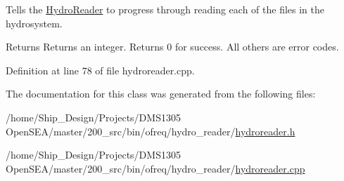 Tells the \hyperlink{classosea_1_1_hydro_reader}{Hydro\-Reader} to progress through reading each of the files in the hydrosystem. 

\begin{DoxyReturn}{Returns}
Returns an integer. Returns 0 for success. All others are error codes. 
\end{DoxyReturn}


Definition at line 78 of file hydroreader.\-cpp.



The documentation for this class was generated from the following files\-:\begin{DoxyCompactItemize}
\item 
/home/\-Ship\-\_\-\-Design/\-Projects/\-D\-M\-S1305 Open\-S\-E\-A/master/200\-\_\-src/bin/ofreq/hydro\-\_\-reader/\hyperlink{hydroreader_8h}{hydroreader.\-h}\item 
/home/\-Ship\-\_\-\-Design/\-Projects/\-D\-M\-S1305 Open\-S\-E\-A/master/200\-\_\-src/bin/ofreq/hydro\-\_\-reader/\hyperlink{hydroreader_8cpp}{hydroreader.\-cpp}\end{DoxyCompactItemize}
